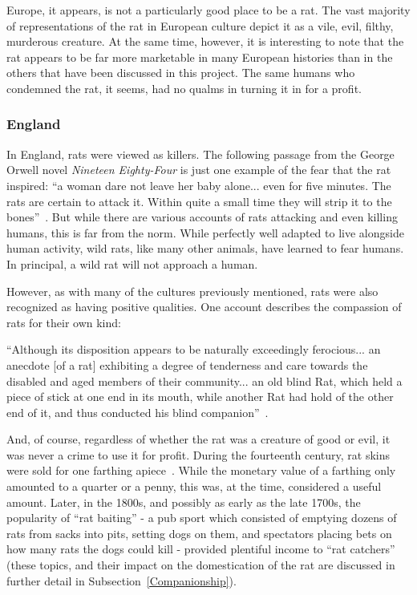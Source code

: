 \documentclass[12pt]{article}
\begin{document}
Europe, it appears, is not a particularly good place to be a rat. The vast majority of representations of the rat in European culture depict it as a vile, evil, filthy, murderous creature. At the same time, however, it is interesting to note that the rat appears to be far more marketable in many European histories than in the others that have been discussed in this project. The same humans who condemned the rat, it seems, had no qualms in turning it in for a profit.

\subsubsection{England} \label{England}

In England, rats were viewed as killers. The following passage from the George Orwell novel \textit{Nineteen Eighty-Four} is just one example of the fear that the rat inspired: ``a woman dare not leave her baby alone... even for five minutes. The rats are certain to attack it. Within quite a small time they will strip it to the bones''~\cite{Barnett2001}. But while there are various accounts of rats attacking and even killing humans, this is far from the norm. While perfectly well adapted to live alongside human activity, wild rats, like many other animals, have learned to fear humans. In principal, a wild rat will not approach a human.

However, as with many of the cultures previously mentioned, rats were also recognized as having positive qualities. One account describes the compassion of rats for their own kind:

``Although its disposition appears to be naturally exceedingly ferocious... an anecdote [of a rat] exhibiting a degree of tenderness and care towards the disabled and aged members of their community... an old blind Rat, which held a piece of stick at one end in its mouth, while another Rat had hold of the other end of it, and thus conducted his blind companion''~\cite{Barnett2001, Marrin2006}.

And, of course, regardless of whether the rat was a creature of good or evil, it was never a crime to use it for profit. During the fourteenth century, rat skins were sold for one farthing apiece~\cite{Barnett2001}. While the monetary value of a farthing only amounted to a quarter or a penny, this was, at the time, considered a useful amount. Later, in the 1800s, and possibly as early as the late 1700s, the popularity of ``rat baiting'' - a pub sport which consisted of emptying dozens of rats from sacks into pits, setting dogs on them, and spectators placing bets on how many rats the dogs could kill - provided plentiful income to ``rat catchers'' (these topics, and their impact on the domestication of the rat are discussed in further detail in Subsection~\ref{Companionship}).
\end{document}
